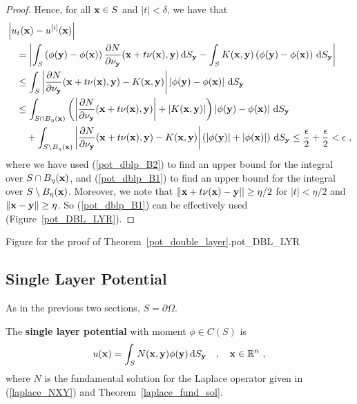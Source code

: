 \begin{proof}
Hence, for all $\mathbf{x} \in S$ and $|t|<\delta$, we have that
\begin{align*}
&\left| u_t(\mathbf{x}) - u^{[i]}(\mathbf{x}) \right| \\
&\quad = \left| \int_S \left( \phi(\mathbf{y}) - \phi(\mathbf{x}) \right) 
\frac{\partial{N}}{\partial \mathbf{\nu}_{\mathbf{y}}}(\mathbf{x} +t \mathbf{\nu}(\mathbf{x}),\mathbf{y})
\,\mathrm{d}{S}_{\mathbf{y}} - \int_S K(\mathbf{x},\mathbf{y})
\left( \phi(\mathbf{y}) - \phi(\mathbf{x}) \right) \,\mathrm{d}{S}_{\mathbf{y}} \right| \\
&\quad \leq \int_S \left|
\frac{\partial{N}}{\partial \mathbf{\nu}_{\mathbf{y}}}(\mathbf{x} +t \mathbf{\nu}(\mathbf{x}),\mathbf{y})
- K(\mathbf{x},\mathbf{y}) \right|
\left| \phi(\mathbf{y}) - \phi(\mathbf{x}) \right| \,\mathrm{d}{S}_{\mathbf{y}} \\
&\quad\leq \int_{S \cap B_{\eta}(\mathbf{x})} \left(
\left|
\frac{\partial{N}}{\partial \mathbf{\nu}_{\mathbf{y}}}(\mathbf{x} +t \mathbf{\nu}(\mathbf{x}),\mathbf{y}) \right|
+\left| K(\mathbf{x},\mathbf{y}) \right| \right)
\left| \phi(\mathbf{y}) - \phi(\mathbf{x}) \right| \,\mathrm{d}{S}_{\mathbf{y}} \\
&\qquad + \int_{S \setminus B_{\eta}(\mathbf{x})}
\left| \frac{\partial{N}}{\partial \mathbf{\nu}_{\mathbf{y}}}(\mathbf{x} +t \mathbf{\nu}(\mathbf{x}),\mathbf{y})
- K(\mathbf{x},\mathbf{y}) \right|
\left( \left| \phi(\mathbf{y})\right|
+ \left|\phi(\mathbf{x}) \right| \right) \,\mathrm{d}{S}_{\mathbf{y}}
\leq \frac{\epsilon}{2} + \frac{\epsilon}{2} < \epsilon \ ,
\end{align*}
where we have used (\ref{pot_dblp_B2}) to find an upper bound for the
integral over $S \cap B_{\eta}(\mathbf{x})$, and (\ref{pot_dblp_B1}) to
find an upper bound for the integral over $S \setminus B_{\eta}(\mathbf{x})$.
Moreover, we note that
$\| \mathbf{x} + t \mathbf{\nu}(\mathbf{x}) - \mathbf{y} || \geq \eta/2$
for $|t| < \eta/2$ and $\|\mathbf{x} - \mathbf{y} \| \geq \eta$.  So
(\ref{pot_dblp_B1}) can be effectively used (Figure~\ref{pot_DBL_LYR}).
\end{proof}

{Figure for the proof of Theorem~\ref{pot_double_layer}.}{pot_DBL_LYR}

\subsection{Single Layer Potential} \label{subsect_SLpot}

As in the previous two sections, $S = \partial \Omega$.

\begin{defn} \label{pot_spl_def}
The {\bfseries single layer potential} with moment
$\phi \in C(S)$ is
\[
u(\mathbf{x}) = \int_S
N(\mathbf{x},\mathbf{y}) \phi(\mathbf{y}) \,\mathrm{d}{S}_{\mathbf{y}} \quad , \quad
\mathbf{x} \in \mathbb{R}^n \ ,
\]
where $N$ is the fundamental solution for the Laplace operator given in
(\ref{laplace_NXY}) and Theorem~\ref{laplace_fund_sol}.
\end{defn}

